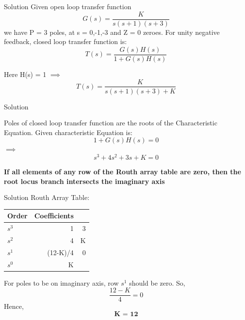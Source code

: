 \documentclass{beamer}
\begin{document}
\begin{frame}{Solution}
Given open loop transfer function\newline
\[G(s) = \frac{K}{s(s+1)(s+3)}\]\newline
we have P = 3 poles, at s = 0,-1,-3 and Z = 0 zeroes.
\newline
\newline
For unity negative feedback, closed loop transfer function is:\newline
\[T(s)= \frac{G(s)H(s)}{1+G(s)H(s)}\]\newline

Here H(s) = 1\newline
$\implies$\[T(s) = \frac{K}{s(s+1)(s+3)+K}\]

\end{frame}

\begin{frame}{Solution}

Poles of closed loop transfer function are the roots of the Characteristic Equation.\newline
Given characteristic Equation is:
\newline
\[ 1 + G(s)H(s) = 0\]\newline
$\implies$ \[ s^3 + 4s^2 + 3s + K = 0\] \newline

\textbf{If all elements of any row of the Routh array table are zero, then the root locus branch intersects the imaginary axis}\newline
\end{frame}

\begin{frame}{Solution}
Routh Array Table:\newline
\begin{table}
\centering
\begin{tabular}{l|r r}
Order & Coefficients\\\hline
$s^3$ & 1 & 3 \\
$s^2$ & 4 & K \\
$s^1$ & (12-K)/4 & 0\\
$s^0$ & K & 
\end{tabular}

\end{table}

For poles to be on imaginary axis, row $s^1$ should be zero.\newline
So, \[\frac{12-K}{4} = 0\]
\newline Hence, $$\textbf{K = 12}$$


\end{frame}
\end{document}
